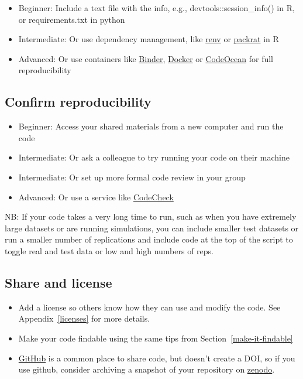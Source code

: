 \documentclass[
  oneside]{book}
\providecommand{\tightlist}{%
  \setlength{\itemsep}{0pt}\setlength{\parskip}{0pt}}
\begin{document}
\begin{itemize}
\tightlist
\item
  {Beginner}: Include a text file with the info, e.g., devtools::session\_info() in R, or requirements.txt in python
\item
  {Intermediate}: Or use dependency management, like \href{https://rstudio.github.io/renv/articles/renv.html}{renv} or \href{https://rstudio.github.io/packrat/}{packrat} in R
\item
  {Advanced}: Or use containers like \href{https://mybinder.org/}{Binder}, \href{https://www.docker.com/}{Docker} or \href{https://codeocean.com/}{CodeOcean} for full reproducibility
\end{itemize}

\hypertarget{confirm-reproducibility}{%
\subsection{Confirm reproducibility}\label{confirm-reproducibility}}

\begin{itemize}
\tightlist
\item
  {Beginner}: Access your shared materials from a new computer and run the code
\item
  {Intermediate}: Or ask a colleague to try running your code on their machine
\item
  {Intermediate}: Or set up more formal code review \citep{vable2021code} in your group
\item
  {Advanced}: Or use a service like \href{https://codecheck.org.uk/}{CodeCheck}
\end{itemize}

NB: If your code takes a very long time to run, such as when you have extremely large datasets or are running simulations, you can include smaller test datasets or run a smaller number of replications and include code at the top of the script to toggle real and test data or low and high numbers of reps.

\hypertarget{share-and-license}{%
\subsection{Share and license}\label{share-and-license}}

\begin{itemize}
\tightlist
\item
  Add a license so others know how they can use and modify the code. See Appendix~\ref{licenses} for more details.
\item
  Make your code findable using the same tips from Section~\ref{make-it-findable}
\item
  \href{https://github.com/}{GitHub} is a common place to share code, but doesn't create a DOI, so if you use github, consider archiving a snapshot of your repository on \href{https://docs.github.com/en/repositories/archiving-a-github-repository/referencing-and-citing-content}{zenodo}.
\end{itemize}
\end{document}
